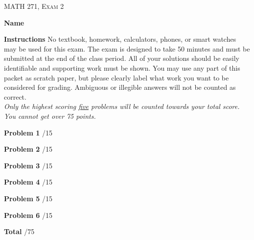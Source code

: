 \documentclass[12pt]{amsbook}
\begin{document}

\begin{center}
   \textsc{\large MATH 271, Exam 2}\\
\end{center}
\vspace{1cm}

\noindent\textbf{Name} \; \underline{\hspace{8cm}}

\vspace{1cm}

\noindent\textbf{Instructions} \; No textbook, homework, calculators, phones, or smart watches may be used for this exam. The exam is designed to take 50 minutes and must be submitted at the end of the class period. All of your solutions should be easily identifiable and supporting work must be shown. You may use any part of this packet as scratch paper, but please clearly label what work you want to be considered for grading. Ambiguous or illegible answers will not be counted as correct.\\

\noindent\emph{Only the highest scoring \underline{five} problems will be counted towards your total score. You cannot get over 75 points.}

\vspace{1cm}

\begin{flushleft}
\textbf{Problem 1} \; \underline{\hspace{1cm}}/15

\vspace{.25cm}

\textbf{Problem 2} \; \underline{\hspace{1cm}}/15

\vspace{.25cm}

\textbf{Problem 3} \; \underline{\hspace{1cm}}/15

\vspace{.25cm}

\textbf{Problem 4} \; \underline{\hspace{1cm}}/15

\vspace{.25cm}

\textbf{Problem 5} \; \underline{\hspace{1cm}}/15

\vspace{.25cm}

\textbf{Problem 6} \; \underline{\hspace{1cm}}/15

\vspace{.5cm}

\textbf{Total} \;\hspace{1.1cm} \underline{\hspace{1.25cm}}/75
\end{flushleft}
\end{document}
